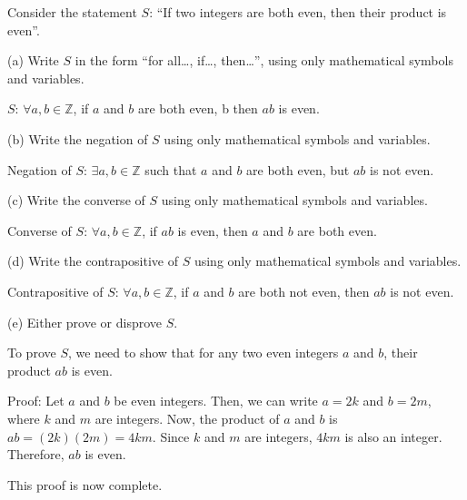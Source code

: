 \documentclass{article}
\begin{document}
Consider the statement $S$: ``If two integers are both even, then their product is even''.

(a) Write $S$ in the form ``for all\ldots, if\ldots, then\ldots'', using only mathematical symbols and variables.

$S$: $\forall a, b \in \mathbb{Z}$, if $a$ and $b$ are both even, b then $ab$ is even.

(b) Write the negation of $S$ using only mathematical symbols and variables.

Negation of $S$: $\exists a, b \in \mathbb{Z}$ such that $a$ and $b$ are both even, but $ab$ is not even.

(c) Write the converse of $S$ using only mathematical symbols and variables.

Converse of $S$: $\forall a, b \in \mathbb{Z}$, if $ab$ is even, then $a$ and $b$ are both even.

(d) Write the contrapositive of $S$ using only mathematical symbols and variables.

Contrapositive of $S$: $\forall a, b \in \mathbb{Z}$, if $a$ and $b$ are both not even, then $ab$ is not even.

(e) Either prove or disprove $S$.

To prove $S$, we need to show that for any two even integers $a$ and $b$, their product $ab$ is even.

Proof: Let $a$ and $b$ be even integers. Then, we can write $a = 2k$ and $b = 2m$, where $k$ and $m$ are integers. Now, the product of $a$ and $b$ is $ab = (2k)(2m) = 4km$. Since $k$ and $m$ are integers, $4km$ is also an integer. Therefore, $ab$ is even.

This proof is now complete.
\end{document}
